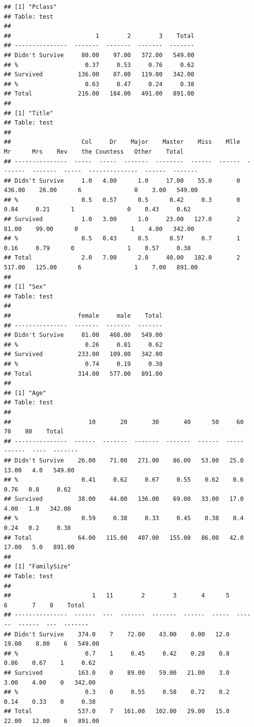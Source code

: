 \documentclass[]{article}
\begin{document}
\begin{verbatim}
## [1] "Pclass"
## Table: test
## 
##                        1        2        3    Total
## ---------------  -------  -------  -------  -------
## Didn't Survive     80.00    97.00   372.00   549.00
## %                   0.37     0.53     0.76     0.62
## Survived          136.00    87.00   119.00   342.00
## %                   0.63     0.47     0.24     0.38
## Total             216.00   184.00   491.00   891.00
## 
## [1] "Title"
## Table: test
## 
##                    Col     Dr    Major    Master    Miss    Mlle       Mr      Mrs    Rev    the Countess   Other    Total
## ---------------  -----  -----  -------  --------  ------  ------  -------  -------  -----  --------------  ------  -------
## Didn't Survive     1.0   4.00      1.0     17.00    55.0       0   436.00    26.00      6               0    3.00   549.00
## %                  0.5   0.57      0.5      0.42     0.3       0     0.84     0.21      1               0    0.43     0.62
## Survived           1.0   3.00      1.0     23.00   127.0       2    81.00    99.00      0               1    4.00   342.00
## %                  0.5   0.43      0.5      0.57     0.7       1     0.16     0.79      0               1    0.57     0.38
## Total              2.0   7.00      2.0     40.00   182.0       2   517.00   125.00      6               1    7.00   891.00
## 
## [1] "Sex"
## Table: test
## 
##                   female     male    Total
## ---------------  -------  -------  -------
## Didn't Survive     81.00   468.00   549.00
## %                   0.26     0.81     0.62
## Survived          233.00   109.00   342.00
## %                   0.74     0.19     0.38
## Total             314.00   577.00   891.00
## 
## [1] "Age"
## Table: test
## 
##                      10       20       30       40      50     60      70    80    Total
## ---------------  ------  -------  -------  -------  ------  -----  ------  ----  -------
## Didn't Survive    26.00    71.00   271.00    86.00   53.00   25.0   13.00   4.0   549.00
## %                  0.41     0.62     0.67     0.55    0.62    0.6    0.76   0.8     0.62
## Survived          38.00    44.00   136.00    69.00   33.00   17.0    4.00   1.0   342.00
## %                  0.59     0.38     0.33     0.45    0.38    0.4    0.24   0.2     0.38
## Total             64.00   115.00   407.00   155.00   86.00   42.0   17.00   5.0   891.00
## 
## [1] "FamilySize"
## Table: test
## 
##                       1   11        2        3       4      5       6       7    8    Total
## ---------------  ------  ---  -------  -------  ------  -----  ------  ------  ---  -------
## Didn't Survive    374.0    7    72.00    43.00    8.00   12.0   19.00    8.00    6   549.00
## %                   0.7    1     0.45     0.42    0.28    0.8    0.86    0.67    1     0.62
## Survived          163.0    0    89.00    59.00   21.00    3.0    3.00    4.00    0   342.00
## %                   0.3    0     0.55     0.58    0.72    0.2    0.14    0.33    0     0.38
## Total             537.0    7   161.00   102.00   29.00   15.0   22.00   12.00    6   891.00
\end{verbatim}
\end{document}
